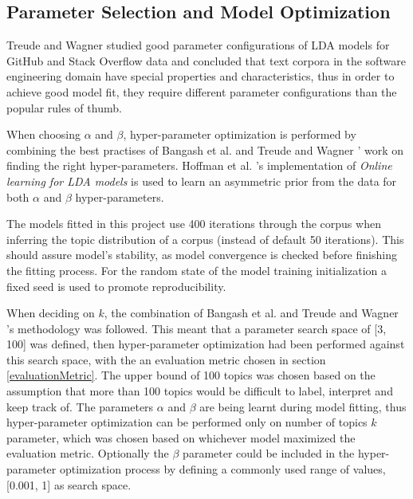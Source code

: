     \subsection{Parameter Selection and Model Optimization}
    
        Treude and Wagner \cite{treude2019predicting} studied good parameter configurations of LDA models for GitHub and Stack Overflow data and concluded that text corpora in the software engineering domain have special properties and characteristics, thus in order to achieve good model fit, they require different parameter configurations than the popular rules of thumb. 
        
        When choosing $\alpha$ and $\beta$, hyper-parameter optimization is performed by combining the best practises of Bangash et al. \cite{bangash2019developers} and Treude and Wagner \cite{treude2019predicting}' work on finding the right hyper-parameters. Hoffman et al. \cite{hoffman2010online}'s implementation of \textit{Online learning for LDA models} is used to learn an asymmetric prior from the data for both $\alpha$ and $\beta$ hyper-parameters.
        
        The models fitted in this project use 400 iterations through the corpus when inferring the topic distribution of a corpus (instead of default 50 iterations). This should assure model's stability, as model convergence is checked before finishing the fitting process. For the random state of the model training initialization a fixed seed is used to promote reproducibility.
        
        When deciding on $k$, the combination of Bangash et al. \cite{bangash2019developers} and Treude and Wagner \cite{treude2019predicting}'s methodology was followed. This meant that a parameter search space of [3, 100] was defined, then hyper-parameter optimization had been performed against this search space, with the an evaluation metric chosen in section \ref{evaluationMetric}. The upper bound of 100 topics was chosen based on the assumption that more than 100 topics would be difficult to label, interpret and keep track of. The parameters $\alpha$ and $\beta$ are being learnt during model fitting, thus  hyper-parameter optimization can be performed only on number of topics $k$ parameter, which was chosen based on whichever model maximized the evaluation metric. Optionally the $\beta$ parameter could be included in the hyper-parameter optimization process by defining a commonly used range of values, [0.001, 1] as search space.
    
